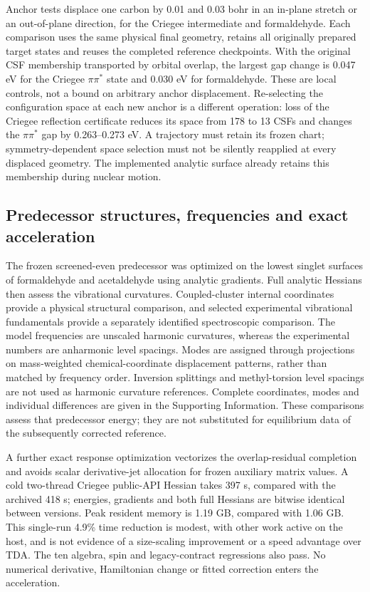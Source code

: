 Anchor tests displace one carbon by 0.01 and 0.03 bohr in an in-plane
stretch or an out-of-plane direction, for the Criegee intermediate and
formaldehyde. Each comparison uses the same physical final geometry,
retains all originally prepared target states and reuses the completed
reference checkpoints. With the original CSF membership transported by
orbital overlap, the largest gap change is 0.047 eV for the Criegee
$\pi\pi^*$ state and 0.030 eV for formaldehyde. These are local controls,
not a bound on arbitrary anchor displacement. Re-selecting the configuration
space at each new anchor is a different operation: loss of the Criegee
reflection certificate reduces its space from 178 to 13 CSFs and changes
the $\pi\pi^*$ gap by 0.263--0.273 eV. A trajectory must retain its frozen
chart; symmetry-dependent space selection must not be silently reapplied
at every displaced geometry. The implemented analytic surface already
retains this membership during nuclear motion.

\subsection{Predecessor structures, frequencies and exact acceleration}
The frozen screened-even predecessor was optimized on the lowest singlet surfaces of
formaldehyde and acetaldehyde using analytic gradients. Full analytic
Hessians then assess the vibrational curvatures. Coupled-cluster internal
coordinates provide a physical structural comparison,\cite{geometries2017}
and selected experimental vibrational fundamentals provide a separately
identified spectroscopic comparison.\cite{formaldehydespectrum1969,acetaldehydespectrum1981}
The model frequencies are unscaled harmonic curvatures, whereas the
experimental numbers are anharmonic level spacings. Modes are assigned
through projections on mass-weighted chemical-coordinate displacement
patterns, rather than matched by frequency order. Inversion splittings and
methyl-torsion level spacings are not used as harmonic curvature references.
Complete coordinates, modes and individual differences are given in the
Supporting Information. These comparisons assess that predecessor energy;
they are not substituted for equilibrium data of the subsequently corrected reference.

A further exact response optimization vectorizes the overlap-residual
completion and avoids scalar derivative-jet allocation for frozen
auxiliary matrix values. A cold two-thread Criegee public-API Hessian takes
397 s, compared with the archived 418 s; energies, gradients and both full
Hessians are bitwise identical between versions. Peak resident memory is
1.19 GB, compared with 1.06 GB. This single-run 4.9\% time reduction is
modest, with other work active on the host, and is not evidence of a
size-scaling improvement or a speed advantage over TDA. The ten algebra,
spin and legacy-contract regressions also pass. No numerical derivative,
Hamiltonian change or fitted correction enters the acceleration.
